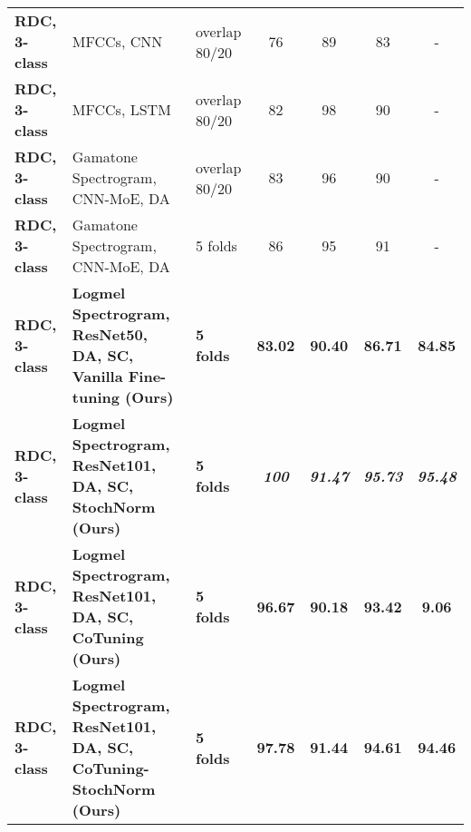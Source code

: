 \documentclass[journal]{IEEEtran}
\begin{document}
\begin{table*}[t]
{\begin{tabular}{l l l c c c c}
        \textbf{RDC, 3-class}   & MFCCs, CNN~\cite{perna2018convolutional}  & overlap 80/20  & 76  & 89   & 83 & -\\
        \textbf{RDC, 3-class}  &  MFCCs, LSTM~\cite{dPerna2019lstm} & overlap 80/20  & 82  & 98  & 90  & -\\
        \textbf{RDC, 3-class}   & Gamatone Spectrogram, CNN-MoE, DA~\cite{pham2020robust}  & overlap 80/20  & 83  & 96  & 90 & - \\
        \textbf{RDC, 3-class}   & Gamatone Spectrogram, CNN-MoE, DA~\cite{pham2021cnn}  & 5 folds  & 86  & 95  & 91 & - \\
        \textbf{RDC, 3-class}   & \textbf{Logmel Spectrogram, ResNet50, DA, SC, Vanilla Fine-tuning (Ours)}   & \textbf{5 folds}  & \textbf{83.02}  & \textbf{90.40}  & \textbf{86.71} & \textbf{84.85} \\
        \textbf{RDC, 3-class} & \textbf{Logmel Spectrogram, ResNet101, DA, SC, StochNorm (Ours)}   & \textbf{5 folds}  & \textit{\textbf{100}}  & \textit{\textbf{91.47}}  & \textit{\textbf{95.73}} & \textit{\textbf{95.48}} \\
        \textbf{RDC, 3-class}   & \textbf{Logmel Spectrogram, ResNet101, DA, SC, CoTuning (Ours)}   & \textbf{5 folds}  & \textbf{96.67}  & \textbf{90.18}  & \textbf{93.42} & \textbf{9.06}\\
        \textbf{RDC, 3-class}   & \textbf{Logmel Spectrogram, ResNet101, DA, SC, CoTuning-StochNorm (Ours)}  & \textbf{5 folds}  & \textbf{97.78}  & \textbf{91.44}  & \textbf{94.61} & \textbf{94.46} \\
        
        \hline
        

\end{tabular}}
\end{table*}
\end{document}
